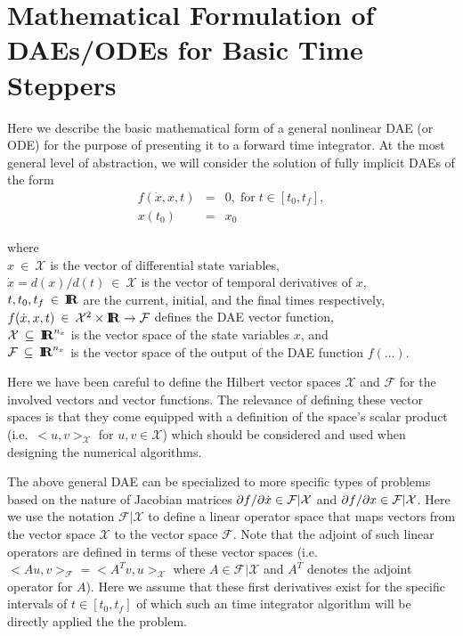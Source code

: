 \documentclass[pdf,ps2pdf,11pt]{SANDreport}
\begin{document}
\section{Mathematical Formulation of DAEs/ODEs for Basic Time Steppers}
\label{rythmos:scn:mathformulation}

Here we describe the basic mathematical form of a general nonlinear DAE (or
ODE) for the purpose of presenting it to a forward time integrator.  At the
most general level of abstraction, we will consider the solution of fully
implicit DAEs of the form
%
\begin{eqnarray}
f(\dot{x},x,t) & = & 0, \; \mbox{for} \; t \in [t_0, t_f], \label{rythmos:eqn:dae} \\
x(t_0) & = & x_0 \label{rythmos:eqn:dae:ic}
\end{eqnarray}
\begin{tabbing}
\hspace{4ex}where\hspace{5ex}\= \\
\>	$x\:\in\:\mathcal{X}$ is the vector of differential state variables, \\
\>	$\dot{x} = d(x)/d(t)\:\in\:\mathcal{X}$ is the vector of temporal derivatives of $x$, \\
\>	$t, t_0, t_f\:\in\:\mbox{\textbf{I}}\hspace{-0.6ex}\mbox{\textbf{R}}$ are the current, initial, and the final times respectively, \\
\>	$f(\dot{x},x,t)\:\in\:\mathcal{X}^2\times\mbox{\textbf{I}}\hspace{-0.6ex}\mbox{\textbf{R}}\rightarrow\mathcal{F}$ defines the DAE vector function, \\
\>	$\mathcal{X} \:\subseteq\:\mbox{\textbf{I}}\hspace{-0.6ex}\mbox{\textbf{R}}^{n_x}$ is the vector space of the state variables $x$, and \\
\>	$\mathcal{F} \:\subseteq\:\mbox{\textbf{I}}\hspace{-0.6ex}\mbox{\textbf{R}}^{n_x}$ is the vector space of the output of the DAE function $f(\ldots)$.
\end{tabbing}

Here we have been careful to define the Hilbert vector spaces $\mathcal{X}$
and $\mathcal{F}$ for the involved vectors and vector functions.  The
relevance of defining these vector spaces is that they come equipped with a
definition of the space's scalar product (i.e.\ $<u,v>_{\mathcal{X}}$ for
$u,v\in\mathcal{X}$) which should be considered and used when designing the
numerical algorithms.

The above general DAE can be specialized to more specific types of problems
based on the nature of Jacobian matrices
$\partial f / \partial \dot{x}\in\mathcal{F}|\mathcal{X}$ and
$\partial f / \partial x\in\mathcal{F}|\mathcal{X}$.  Here we use the notation
$\mathcal{F}|\mathcal{X}$ to define a linear operator space that maps vectors
from the vector space $\mathcal{X}$ to the vector space $\mathcal{F}$.  Note
that the adjoint of such linear operators are defined in terms of these vector
spaces (i.e.\ $<A u,v>_{\mathcal{F}} = <A^T v,u>_{\mathcal{X}}$ where
$A\in\mathcal{F}|\mathcal{X}$ and $A^T$ denotes the adjoint operator for $A$).
Here we assume that these first derivatives exist for the specific intervals
of $t\in[t_0,t_f]$ of which such an time integrator algorithm will be directly
applied the the problem.
\end{document}
